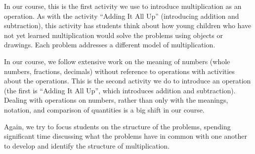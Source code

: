\documentclass{ximera}
\begin{document}
\newpage
\begin{instructorNotes}
In our course, this is the first activity we use to introduce multiplication as an operation.  As with the activity ``Adding It All Up'' (introducing addition and subtraction), this activity has students think about how young children who have not yet learned multiplication would solve the problems using objects or drawings.  Each problem addresses a different model of multiplication.

In our course, we follow extensive work on the meaning of numbers (whole numbers, fractions, decimals) without reference to operations with activities about the operations.  This is the second activity we do to introduce an operation (the first is ``Adding It All Up'', which introduces addition and subtraction). Dealing with operations on numbers, rather than only with the meanings, notation, and comparison of quantities is a big shift in our course.

Again, we try to focus students on the structure of the problems, spending significant time discussing what the problems have in common with one another to develop and identify the structure of multiplication.


\end{instructorNotes}
\end{document}
